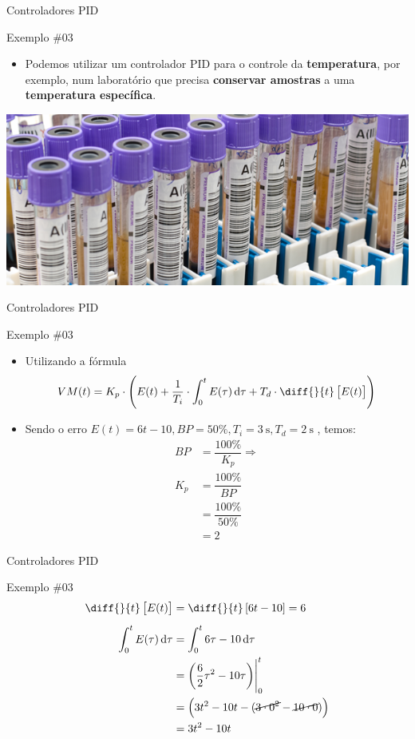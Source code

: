 \begin{frame}{Controladores PID}
	\begin{block}{Exemplo \#03}
		\begin{itemize}
			\item Podemos utilizar um controlador PID para o controle da \textbf{temperatura}, por exemplo, num laboratório que precisa \textbf{conservar amostras} a uma \textbf{temperatura específica}.
		\end{itemize}
	\end{block}
	
	\medskip
	
	\centering
	
	\includegraphics[width=0.9\linewidth]{Figuras/Ch13/fig7}
\end{frame}


\begin{frame}{Controladores PID}
	\begin{block}{Exemplo \#03}
		\begin{itemize}
			\item Utilizando a fórmula
			\[ VM(t)=K_p\cdot\left( E(t)+\dfrac{1}{T_i}\cdot \int_{0}^{t}E(\tau)\dif \tau +T_d\cdot\diff{}{t}\sbr{E(t)}\right) \]
			\item Sendo o erro $ E(t)=6t-10, BP=50\%, T_i=\SI{3}{\second}, T_d=\SI{2}{\second} $ , temos:
			\begin{align*}
				BP	&=\dfrac{100\%}{K_p}\Rightarrow\\
				K_p	&=\dfrac{100\%}{BP}\\
					&=\dfrac{100\%}{50\%}\\
					&=2
			\end{align*}
		\end{itemize}
	\end{block}
\end{frame}


\begin{frame}{Controladores PID}
	\begin{block}{Exemplo \#03}
		\begin{align*}
			\diff{}{t}\sbr{E(t)}&=\diff{}{t}\sbr{6t-10}=6\\[0.5em]
			\int_{0}^{t}E(\tau)\dif\tau	&=\int_{0}^{t}6\tau-10\dif\tau\\
										&=\eval{\del{\dfrac{6}{2}\tau^{2}-10\tau}}_{0}^{t}\\
										&=\del{3t^{2}-10t-\del{\cancel{3\cdot0^{2}}-\cancel{10\cdot0}}}\\
										&=3t^{2}-10t
		\end{align*}
	\end{block}
\end{frame}


